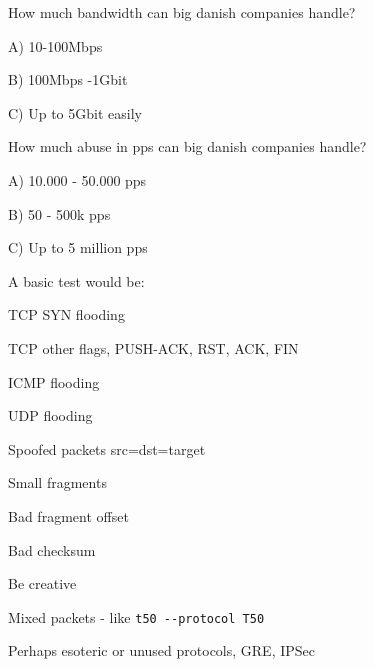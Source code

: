 \documentclass[20pt,landscape,a4paper,footrule]{foils}
\begin{document}

How much bandwidth can big danish companies handle?
\begin{list2}
\item A) 10-100Mbps
\item B) 100Mbps -1Gbit
\item C) Up to 5Gbit easily
\end{list2}

How much abuse in pps can big danish companies handle?
\begin{list2}
\item A) 10.000 - 50.000 pps
\item B) 50 - 500k pps
\item C) Up to 5 million pps
\end{list2}


A basic test would be:
\begin{list2}
\item TCP SYN flooding
\item TCP other flags, PUSH-ACK, RST, ACK, FIN
\item ICMP flooding
\item UDP flooding
\item Spoofed packets src=dst=target \smiley
\item Small fragments
\item Bad fragment offset
\item Bad checksum
\item Be creative
\item Mixed packets - like \verb+t50 --protocol T50+
\item Perhaps esoteric or unused protocols, GRE, IPSec
\end{list2}

\end{document}
